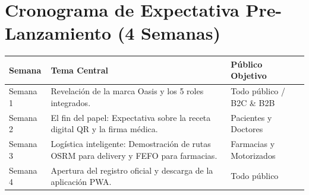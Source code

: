 \documentclass[11pt,a4paper]{article}
\begin{document}
\section{Cronograma de Expectativa Pre-Lanzamiento (4 Semanas)}
\begin{tabularx}{\textwidth}{lXX}
\toprule
\textbf{Semana} & \textbf{Tema Central} & \textbf{Público Objetivo} \\
\midrule
Semana 1 & Revelación de la marca Oasis y los 5 roles integrados. & Todo público / B2C \& B2B \\
Semana 2 & El fin del papel: Expectativa sobre la receta digital QR y la firma médica. & Pacientes y Doctores \\
Semana 3 & Logística inteligente: Demostración de rutas OSRM para delivery y FEFO para farmacias. & Farmacias y Motorizados \\
Semana 4 & Apertura del registro oficial y descarga de la aplicación PWA. & Todo público \\
\bottomrule
\end{tabularx}
\end{document}

